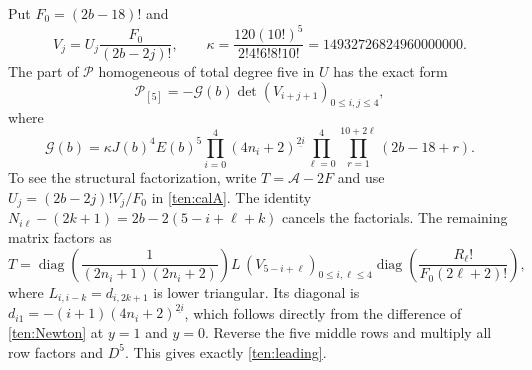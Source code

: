 Put $F_0=(2b-18)!$ and
\[
 V_j=U_j\frac{F_0}{(2b-2j)!},\qquad
 \kappa=\frac{120(10!)^5}{2!4!6!8!10!}
         =14932726824960000000.
\]
The part of $\mathscr P$ homogeneous of total degree five in $U$
has the exact form
\begin{equation}\label{ten:leading}
 \mathscr P_{[5]}=-\mathscr G(b)\det(V_{i+j+1})_{0\le i,j\le4},
\end{equation}
where
\[
 \mathscr G(b)=\kappa J(b)^4E(b)^5
 \prod_{i=0}^{4}(4n_i+2)^{\underline{2i}}
 \prod_{\ell=0}^{4}\prod_{r=1}^{10+2\ell}(2b-18+r).
\]
To see the structural factorization, write
$T=\mathcal A-2F$ and use $U_j=(2b-2j)!V_j/F_0$ in
\eqref{ten:calA}.  The identity
$N_{i\ell}-(2k+1)=2b-2(5-i+\ell+k)$ cancels the factorials.
The remaining matrix factors as
\[
 T=\operatorname{diag}\!\left(\frac1{(2n_i+1)(2n_i+2)}\right)
       L\,(V_{5-i+\ell})_{0\le i,\ell\le4}
       \operatorname{diag}\!\left(\frac{R_\ell!}{F_0(2\ell+2)!}\right),
\]
where $L_{i,i-k}=d_{i,2k+1}$ is lower triangular.  Its diagonal is
$d_{i1}=-(i+1)(4n_i+2)^{\underline{2i}}$, which follows directly
from the difference of \eqref{ten:Newton} at $y=1$ and $y=0$.
Reverse the five middle rows and multiply all row factors and
$D^5$.  This gives exactly \eqref{ten:leading}.

